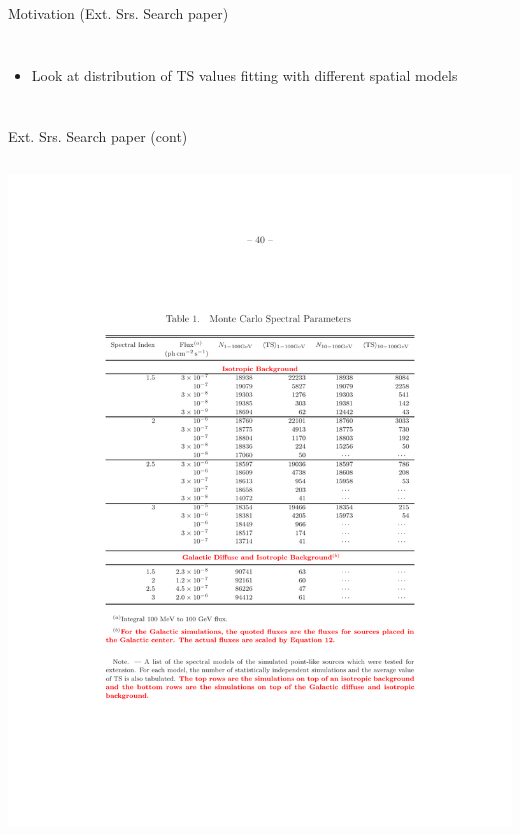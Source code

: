 \documentclass[12pt]{beamer}
\begin{document}
\begin{frame}{Motivation (Ext. Srs. Search paper)}
\begin{columns}
  \begin{itemize}
    \item Look at distribution of TS values fitting with different spatial models
  \end{itemize}
\end{columns}

\end{frame}



\begin{frame}{Ext. Srs. Search paper (cont)}
\begin{columns}
  \includegraphics[scale=0.4]{plots/ext_src_table.pdf}

\end{columns}
\end{frame}
\end{document}
